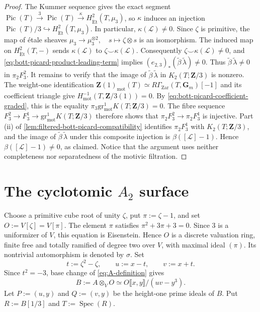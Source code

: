 \documentclass[10pt]{amsart}
\newcommand{\gr}{\mathrm{gr}}
\newcommand{\Et}{\mathrm{\acute{E}t}}
\DeclareMathOperator{\Pic}{Pic}
\DeclareMathOperator{\Spec}{Spec}
\newcommand{\mot}{\operatorname{mot}}
\theoremstyle{remark}
\begin{document}
\begin{proof}
	The Kummer sequence gives the exact segment
	\(
	\Pic(T)\xrightarrow{3}\Pic(T)\xrightarrow{\kappa}
	H^2_{\Et}(T,\mu_3)
	\), so \(\kappa\) induces an injection
	\(\Pic(T)/3\hookrightarrow H^2_{\Et}(T,\mu_3)\). In particular,
	\(\kappa(\mathcal L)\ne0\). Since \(\zeta\) is primitive, the map of
	\'etale sheaves
	\(
	\mu_3\to\mu_3^{\otimes2},\quad s\mapsto\zeta\otimes s
	\)
	is an isomorphism. The induced map on \(H^2_{\Et}(T,-)\) sends
	\(\kappa(\mathcal L)\) to \(\zeta\smile\kappa(\mathcal L)\).
	Consequently \(\zeta\smile\kappa(\mathcal L)\ne0\), and
	\eqref{eq:bott-picard-product-leading-term} implies
	\((e_{2,3})_*(\widetilde\beta\,\widetilde\lambda)\ne0\). Thus \(\widetilde\beta\,\widetilde\lambda\ne0\) in \(\pi_2F^2_3\).
	It remains to verify that the image of \(\widetilde\beta\,\widetilde\lambda\) in
	\(K_2(T;\mathbf Z/3)\) is nonzero. The weight-one identification
	\(\mathbf Z(1)_{\mot}(T)\simeq
	R\Gamma_{\mathrm{Zar}}(T,\mathbf G_m)[-1]\) and its coefficient
	triangle give
	\(H^{-1}_{\mot}(T,\mathbf Z/3(1))=0\). By
	\eqref{eq:bott-picard-coefficient-graded}, this is the equality
	\(\pi_3\gr^1_{\mot}K(T;\mathbf Z/3)=0\). The fibre sequence
	\(F^2_3\to F^1_3\to\gr^1_{\mot}K(T;\mathbf Z/3)\) therefore shows
	that \(\pi_2F^2_3\to\pi_2F^1_3\) is injective. Part \textup{(ii)} of
	\cref{lem:filtered-bott-picard-compatibility} identifies
	\(\pi_2F^1_3\) with \(K_2(T;\mathbf Z/3)\), and the image of \(\widetilde\beta\,\widetilde\lambda\)
	under this composite injection is \(\beta([\mathcal L]-1)\). Hence
	\(\beta([\mathcal L]-1)\ne0\), as claimed. Notice that the argument
	uses neither completeness nor separatedness of the motivic filtration.
\end{proof}





\section{The cyclotomic \texorpdfstring{$A_2$}{A2} surface}

Choose a primitive cube root of unity \(\zeta\), put
\(\pi:=\zeta-1\), and set
\(
O:=V[\zeta]=V[\pi].
\)
The element \(\pi\) satisfies
\(
\pi^2+3\pi+3=0.
\)
Since \(3\) is a uniformizer of \(V\), this equation is Eisenstein.
Hence \(O\) is a discrete valuation ring, finite free and totally ramified
of degree two over \(V\), with maximal ideal \((\pi)\).  Its nontrivial
automorphism is denoted by \(\sigma\).  Set
\[
 t:=\zeta^2-\zeta,\qquad u:=x-t,\qquad v:=x+t.
\]
Since $t^2=-3$, base change of \eqref{eq:A-definition} gives
\begin{equation}\label{eq:B-definition}
 B:=A\otimes_VO\simeq O\llbracket x,y\rrbracket/(uv-y^3).
\end{equation}
Let $P:=(u,y)$ and $Q:=(v,y)$ be the height-one prime ideals of $B$.
Put \(R:=B[1/3]\) and \(T:=\Spec(R)\).
\end{document}

